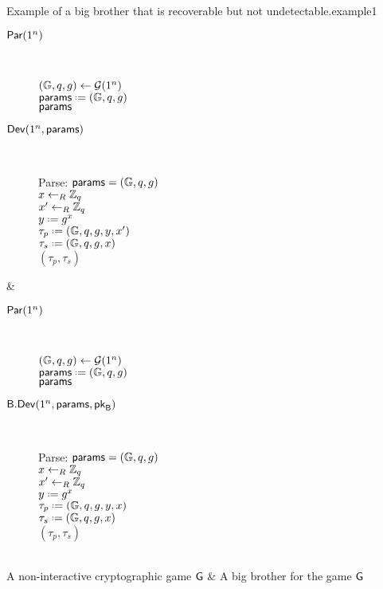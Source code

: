 \begin{boxfigTwo}{Example of a big brother that is recoverable but not undetectable.}{example1}
\begin{minipage}{0.45\textwidth}
    \smallskip
	\begin{description}
 	 \item[\underline{$\operatorname{\mathsf{Par}}(1^n)$}] ~ 
  	
		$(\mathbb{G},q,g)\leftarrow\operatorname{\mathcal{G}}(1^n)$\\
		$\params \defeq (\cgroup,\order,\generator)$\\
		\Ret $\mathsf{params}$ 	
		
 	\item[\underline{$\operatorname{\mathsf{Dev}}(1^n,\mathsf{params})$}] ~
 	
 		Parse: $\mathsf{params} = (\mathbb{G},q,g)$\\
 		$x\leftarrow_R\mathbb{Z}_q$ \\
 		$x'\leftarrow_R\mathbb{Z}_q$ \\
 		$y\defeq g^x$ \\
 		$\tau_p \defeq (\cgroup,\order,\generator,y,x')$ \\
 		$\tau_s \defeq (\cgroup,\order,\generator,x)$ \\
 		\Ret $(\tau_p,\tau_s)$
 		\smallskip
  	\end{description}
\end{minipage}
    & 
\begin{minipage}{0.45\textwidth}
    \smallskip
	\begin{description}
  	 \item[\underline{$\operatorname{\mathsf{Par}}(1^n)$}] ~ 
  	
		$(\mathbb{G},q,g)\leftarrow\operatorname{\mathcal{G}}(1^n)$\\
		$\params \defeq (\cgroup,\order,\generator)$\\
		\Ret $\mathsf{params}$ 	
		
 	\item[\underline{$\mathsf{B}.\mathsf{Dev}(1^n,\mathsf{params},\mathsf{pk}_{\mathsf{B}})$}] ~
 	
 		Parse: $\mathsf{params} = (\mathbb{G},q,g)$\\
 		$x\leftarrow_R\mathbb{Z}_q$ \\
 		$x'\leftarrow_R\mathbb{Z}_q$ \\
 		$y\defeq g^x$ \\
 		$\tau_p \defeq (\cgroup,\order,\generator,y,x)$ \\
 		$\tau_s \defeq (\cgroup,\order,\generator,x)$ \\
 		\Ret $(\tau_p,\tau_s)$
 		\smallskip
  	\end{description}
\end{minipage}
     \\ \hline 
	 A non-interactive cryptographic game $\operatorname{\mathsf{G}}$ &
	  A big brother for the game $\operatorname{\mathsf{G}}$
	 \\
\end{boxfigTwo}

